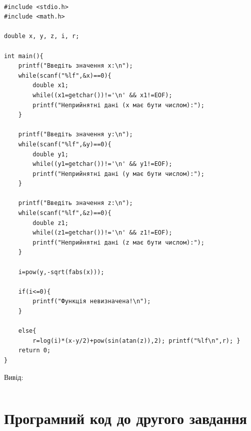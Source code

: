 \documentclass{article}
\begin{document}
\begin{lstlisting}[frame=single]

#include <stdio.h>
#include <math.h>

double x, y, z, i, r;

int main(){
	printf("Введіть значення x:\n");
	while(scanf("%lf",&x)==0){
		double x1;
		while((x1=getchar())!='\n' && x1!=EOF);
		printf("Неприйнятні дані (x має бути числом):");
	}

	printf("Введіть значення y:\n");
	while(scanf("%lf",&y)==0){
		double y1;
		while((y1=getchar())!='\n' && y1!=EOF);
		printf("Неприйнятні дані (y має бути числом):");
	}

	printf("Введіть значення z:\n");
	while(scanf("%lf",&z)==0){
		double z1;
		while((z1=getchar())!='\n' && z1!=EOF);
		printf("Неприйнятні дані (z має бути числом):");
	}

	i=pow(y,-sqrt(fabs(x)));

	if(i<=0){
		printf("Функція невизначена!\n");
	}

	else{
		r=log(i)*(x-y/2)+pow(sin(atan(z)),2); printf("%lf\n",r); }
	return 0;
}

\end{lstlisting}

{\fontsize{14}{16.1}\selectfont
Вивід:}

\begin{lstlisting}

\end{lstlisting}

\section{Програмний код до другого завдання}
\end{document}
